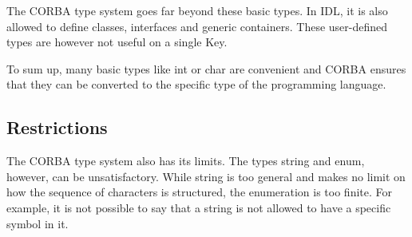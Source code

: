The {\ttfamily C\+O\+R\+B\+A} type system goes far beyond these basic types. In I\+D\+L, it is also allowed to define classes, interfaces and generic containers. These user-\/defined types are however not useful on a single Key.

To sum up, many basic types like int or char are convenient and C\+O\+R\+B\+A ensures that they can be converted to the specific type of the programming language.

\subsection*{Restrictions}

The {\ttfamily C\+O\+R\+B\+A} type system also has its limits. The types {\ttfamily string} and {\ttfamily enum}, however, can be unsatisfactory. While string is too general and makes no limit on how the sequence of characters is structured, the enumeration is too finite. For example, it is not possible to say that a string is not allowed to have a specific symbol in it. 